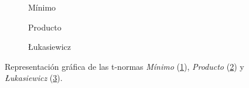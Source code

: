 \begin{figure}[H]
	\centering
	\begin{subfigure}[b]{0.45\textwidth}
		\newlength\figureheight 
		\newlength\figurewidth
		\setlength\figureheight{4.5cm}
		\setlength\figurewidth{6cm}
		
		\caption{Mínimo}
		\label{fig:t-norms-min}
	\end{subfigure}
	\qquad
	\begin{subfigure}[b]{0.45\textwidth}
		\setlength\figureheight{4.5cm}
		\setlength\figurewidth{6cm}
		
		\caption{Producto}
		\label{fig:t-norms-prod}
	\end{subfigure}
	
	\vspace{1 cm}
	\begin{subfigure}[b]{0.45\textwidth}
		\setlength\figureheight{4.5cm}
		\setlength\figurewidth{6cm}
		
		\caption{\L{}ukasiewicz}
		\label{fig:t-norms-lukasiewicz}
	\end{subfigure}
	\label{fig:t-norms}
	\caption{Representación gráfica de las t-normas \emph{Mínimo} (\ref{fig:t-norms-min}), \emph{Producto} (\ref{fig:t-norms-prod}) y \emph{\L{}ukasiewicz} (\ref{fig:t-norms-lukasiewicz}).}
\end{figure}

